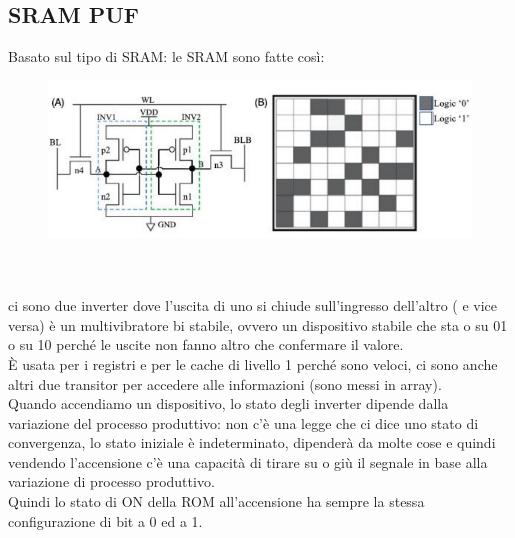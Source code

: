 \documentclass[oneside, 12pt]{extbook}
\begin{document}
\subsection{SRAM PUF}
Basato sul tipo di SRAM: le SRAM sono fatte così:\\
\begin{figure}[!h]
	\includegraphics[scale=0.4]{immagini/hardware/sram_puf.png}
\end{figure}
\\\\ci sono due inverter dove l'uscita di uno si chiude sull'ingresso dell'altro ( e vice versa) è un multivibratore bi stabile, ovvero un dispositivo stabile che sta o su 01 o su 10 perché le uscite non fanno altro che confermare il valore.
\\È usata per i registri e per le cache di livello 1 perché sono veloci, ci sono anche altri due transitor per accedere alle informazioni (sono messi in array).
\\Quando accendiamo un dispositivo, lo stato degli inverter dipende dalla variazione del processo produttivo: non c'è una legge che ci dice uno stato di convergenza, lo stato iniziale è indeterminato, dipenderà da molte cose e quindi vendendo l'accensione c'è una capacità di tirare su o giù il segnale in base alla variazione di processo produttivo.
\\Quindi lo stato di ON della ROM all'accensione ha sempre la stessa configurazione di bit a 0 ed a 1.
\end{document}
